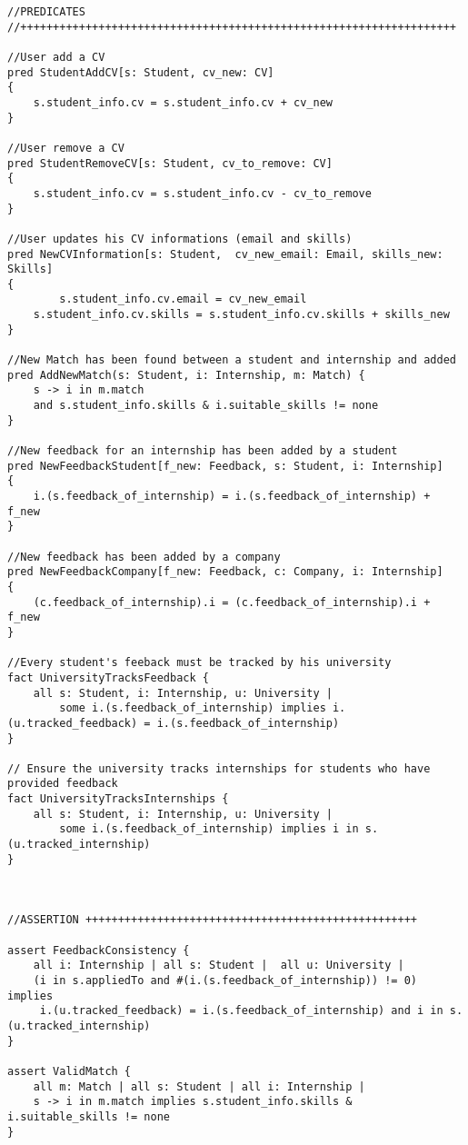 \begin{lstlisting}
//PREDICATES
//+++++++++++++++++++++++++++++++++++++++++++++++++++++++++++++++++++

//User add a CV
pred StudentAddCV[s: Student, cv_new: CV]
{
	s.student_info.cv = s.student_info.cv + cv_new
} 

//User remove a CV
pred StudentRemoveCV[s: Student, cv_to_remove: CV]
{
	s.student_info.cv = s.student_info.cv - cv_to_remove
}

//User updates his CV informations (email and skills)
pred NewCVInformation[s: Student,  cv_new_email: Email, skills_new: Skills]
{
    	s.student_info.cv.email = cv_new_email
	s.student_info.cv.skills = s.student_info.cv.skills + skills_new
}

//New Match has been found between a student and internship and added
pred AddNewMatch(s: Student, i: Internship, m: Match) {
    s -> i in m.match
    and s.student_info.skills & i.suitable_skills != none
}

//New feedback for an internship has been added by a student
pred NewFeedbackStudent[f_new: Feedback, s: Student, i: Internship]
{
    i.(s.feedback_of_internship) = i.(s.feedback_of_internship) + f_new
}

//New feedback has been added by a company
pred NewFeedbackCompany[f_new: Feedback, c: Company, i: Internship]
{
    (c.feedback_of_internship).i = (c.feedback_of_internship).i + f_new
}

//Every student's feeback must be tracked by his university
fact UniversityTracksFeedback {
    all s: Student, i: Internship, u: University |
        some i.(s.feedback_of_internship) implies i.(u.tracked_feedback) = i.(s.feedback_of_internship)
}

// Ensure the university tracks internships for students who have provided feedback
fact UniversityTracksInternships {
    all s: Student, i: Internship, u: University |
        some i.(s.feedback_of_internship) implies i in s.(u.tracked_internship)
}



//ASSERTION +++++++++++++++++++++++++++++++++++++++++++++++++++

assert FeedbackConsistency {
    all i: Internship | all s: Student |  all u: University |
    (i in s.appliedTo and #(i.(s.feedback_of_internship)) != 0) implies 
     i.(u.tracked_feedback) = i.(s.feedback_of_internship) and i in s.(u.tracked_internship)
}

assert ValidMatch {
    all m: Match | all s: Student | all i: Internship |
    s -> i in m.match implies s.student_info.skills & i.suitable_skills != none
}



\end{lstlisting}
